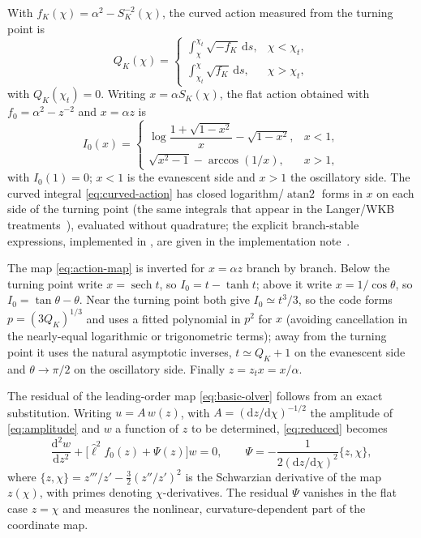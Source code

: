 \documentclass[prd, twocolumn, superscriptaddress, tightenlines, longbibliography, nofootinbib, eqsecnum, amsfonts, amsmath, floatfix, notitlepage]{revtex4-2}
\newcommand{\code}[1]{\texttt{\detokenize{#1}}}
\newcommand{\dd}{\mathrm{d}}
\newcommand{\SK}{S_K}
\newcommand{\atanTwo}{\operatorname{atan2}}
\newcommand{\sech}{\operatorname{sech}}
\begin{document}
With $f_K(\chi)=\alpha^2-\SK^{-2}(\chi)$, the curved action measured from the
turning point is
\begin{equation}
  Q_K(\chi)=
  \begin{cases}
  \displaystyle\int_\chi^{\chi_t}\sqrt{-f_K}\,\dd s, & \chi<\chi_t,\\[1.4ex]
  \displaystyle\int_{\chi_t}^{\chi}\sqrt{f_K}\,\dd s, & \chi>\chi_t,
  \end{cases}
  \label{eq:curved-action}
\end{equation}
with $Q_K(\chi_t)=0$. Writing $x=\alpha\SK(\chi)$, the flat action obtained with
$f_0=\alpha^2-z^{-2}$ and $x=\alpha z$ is
\begin{equation}
  I_0(x)=
  \begin{cases}
  \log\!\dfrac{1+\sqrt{1-x^2}}{x}-\sqrt{1-x^2}, & x<1,\\[1.4ex]
  \sqrt{x^2-1}-\arccos(1/x), & x>1,
  \end{cases}
  \label{eq:flat-action}
\end{equation}
with $I_0(1)=0$; $x<1$ is the evanescent side and $x>1$ the oscillatory side. The
curved integral \cref{eq:curved-action} has closed logarithm/$\atanTwo$ forms in
$x$ on each side of the turning point (the same integrals that appear in the
Langer/WKB
treatments~\cite{Kosowsky:1998nc,tram2013}), evaluated without quadrature; the
explicit branch-stable expressions, implemented in \code{qintegral_exact}, are
given in the implementation note~\cite{cambhypersphericalbessel}.

The map \cref{eq:action-map} is inverted for $x=\alpha z$ branch by branch. Below
the turning point write $x=\sech t$, so $I_0=t-\tanh t$; above it write
$x=1/\cos\theta$, so $I_0=\tan\theta-\theta$. Near the turning point both give
$I_0\simeq t^3/3$, so the code forms $p=(3Q_K)^{1/3}$ and uses a fitted polynomial
in $p^2$ for $x$ (avoiding cancellation in the nearly-equal logarithmic or
trigonometric terms); away from the turning point it uses the natural asymptotic
inverses, $t\simeq Q_K+1$ on the evanescent side and $\theta\to\pi/2$ on the
oscillatory side. Finally $z=z_t x=x/\alpha$.

The residual of the leading-order map \cref{eq:basic-olver} follows from an exact
substitution. Writing $u=A\,w(z)$, with
$A=(\dd z/\dd\chi)^{-1/2}$ the amplitude of \cref{eq:amplitude} and $w$ a
function of $z$ to be determined, \cref{eq:reduced} becomes
\begin{equation}
  \frac{\dd^2w}{\dd z^2}
  +\big[\hat\ell^2 f_0(z)+\Psi(z)\big]w=0,\qquad
  \Psi=-\frac{1}{2(\dd z/\dd\chi)^2}\{z,\chi\},
  \label{eq:olver-residual}
\end{equation}
where
$\{z,\chi\}=z'''/z'-\tfrac32(z''/z')^2$ is the Schwarzian derivative of the
map $z(\chi)$, with primes denoting $\chi$-derivatives. The residual $\Psi$
vanishes in the flat case $z=\chi$ and measures the nonlinear,
curvature-dependent part of the coordinate map.
\end{document}

